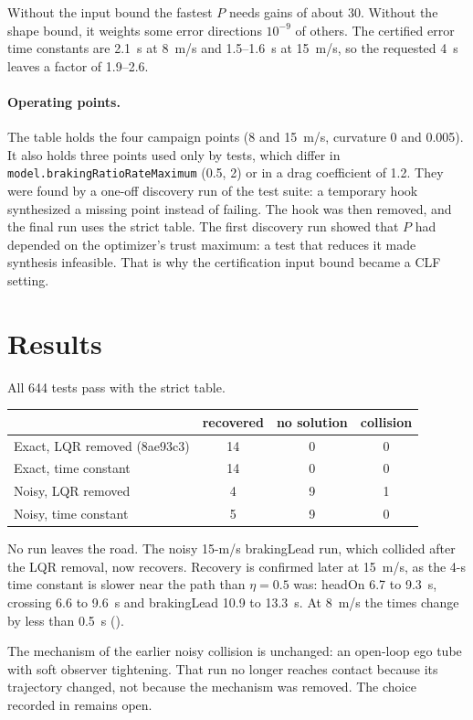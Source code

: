 \documentclass[11pt]{article}
\begin{document}
Without the input bound the fastest $P$ needs gains of about 30. Without the
shape bound, it weights some error directions $10^{-9}$ of others. The
certified error time constants are 2.1~s at 8~m/s and 1.5--1.6~s at 15~m/s, so
the requested 4~s leaves a factor of 1.9--2.6.

\paragraph{Operating points.} The table holds the four campaign points (8 and
15~m/s, curvature 0 and 0.005). It also holds three points used only by tests,
which differ in \texttt{model.brakingRatioRateMaximum} (0.5, 2) or in a drag
coefficient of 1.2. They were found by a one-off discovery run of the test
suite: a temporary hook synthesized a missing point instead of failing. The
hook was then removed, and the final run uses the strict table. The first
discovery run showed that $P$ had depended on the optimizer's trust maximum: a
test that reduces it made synthesis infeasible. That is why the certification
input bound became a CLF setting.

\section{Results}
All 644 tests pass with the strict table.

\begin{center}
\begin{tabular}{lccc}
\toprule
 & recovered & no solution & collision\\
\midrule
Exact, LQR removed (8ae93c3) & 14 & 0 & 0\\
Exact, time constant & 14 & 0 & 0\\
Noisy, LQR removed & 4 & 9 & 1\\
Noisy, time constant & 5 & 9 & 0\\
\bottomrule
\end{tabular}
\end{center}
No run leaves the road. The noisy 15-m/s brakingLead run, which collided after
the LQR removal, now recovers. Recovery is confirmed later at 15~m/s, as the
4-s time constant is slower near the path than $\eta=0.5$ was: headOn 6.7 to
9.3~s, crossing 6.6 to 9.6~s and brakingLead 10.9 to 13.3~s. At 8~m/s the
times change by less than 0.5~s
().

The mechanism of the earlier noisy collision is unchanged: an open-loop ego
tube with soft observer tightening. That run no longer reaches contact because
its trajectory changed, not because the mechanism was removed. The choice
recorded in  remains open.
\end{document}
